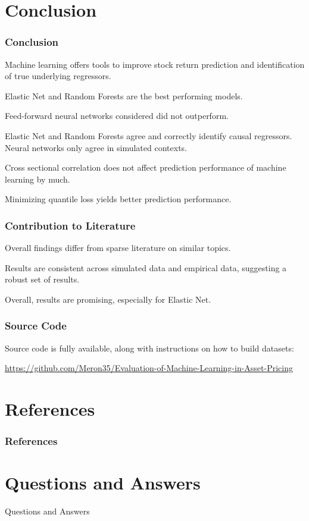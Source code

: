 \documentclass[aspectratio=169]{beamer}
\begin{document}
\section{Conclusion}
\begin{frame}
\frametitle{Conclusion}

Machine learning offers tools to improve stock return prediction and identification of true underlying regressors. 

Elastic Net and Random Forests are the best performing models.

Feed-forward neural networks considered did not outperform.

Elastic Net and Random Forests agree and correctly identify causal regressors. Neural networks only agree in simulated contexts. 

Cross sectional correlation does not affect prediction performance of machine learning by much.

Minimizing quantile loss yields better prediction performance.
\end{frame}

\begin{frame}
\frametitle{Contribution to Literature}
Overall findings differ from sparse literature on similar topics.

Results are consistent across simulated data and empirical data, suggesting a robust set of results.

Overall, results are promising, especially for Elastic Net.
\end{frame}

\begin{frame}
\frametitle{Source Code}
Source code is fully available, along with instructions on how to build datasets:

\url{https://github.com/Meron35/Evaluation-of-Machine-Learning-in-Asset-Pricing}
\end{frame}

\section{References}
\begin{frame}
\frametitle{References}


\end{frame}

\section{Questions and Answers}

\begin{frame}
\begin{center}
\huge Questions and Answers
\end{center}
\end{frame}
\end{document}
